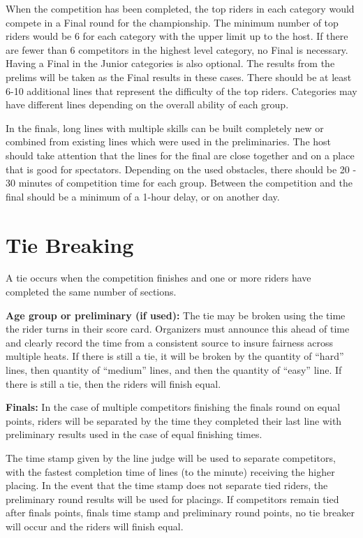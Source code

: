When the competition has been completed, the top riders in each category would compete in a Final round for the championship.
The minimum number of top riders would be 6 for each category with the upper limit up to the host.
If there are fewer than 6 competitors in the highest level category, no Final is necessary.
Having a Final in the Junior categories is also optional.
The results from the prelims will be taken as the Final results in these cases.
There should be at least 6-10 additional lines that represent the difficulty of the top riders.
Categories may have different lines depending on the overall ability of each group.

In the finals, long lines with multiple skills can be built completely new or combined from existing lines which were used in the preliminaries.
The host should take attention that the lines for the final are close together and on a place that is good for spectators.
Depending on the used obstacles, there should be 20 - 30 minutes of competition time for each group.
Between the competition and the final should be a minimum of a 1-hour delay, or on another day.

\section{Tie Breaking}
A tie occurs when the competition finishes and one or more riders have completed the same number of sections.

\textbf{Age group or preliminary (if used):} The tie may be broken using the time the rider turns in their score card.
Organizers must announce this ahead of time and clearly record the time from a consistent source to insure fairness across multiple heats.
If there is still a tie, it will be broken by the quantity of ``hard'' lines, then quantity of ``medium'' lines, and then the quantity of ``easy'' line.
If there is still a tie, then the riders will finish equal.

\textbf{Finals:} In the case of multiple competitors finishing the finals round on equal points, riders will be separated by the time they completed their last line with preliminary results used in the case of equal finishing times.

The time stamp given by the line judge will be used to separate competitors, with the fastest completion time of lines (to the minute) receiving the higher placing.
In the event that the time stamp does not separate tied riders, the preliminary round results will be used for placings.
If competitors remain tied after finals points, finals time stamp and preliminary round points, no tie breaker will occur and the riders will finish equal.
